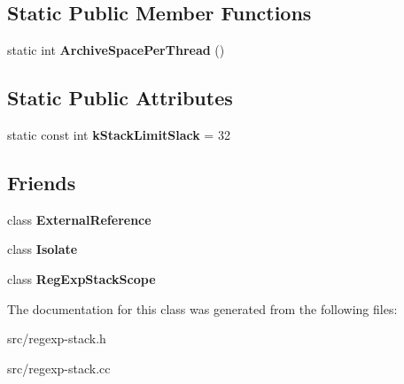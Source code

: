 \subsection*{Static Public Member Functions}
\begin{DoxyCompactItemize}
\item 
\hypertarget{classv8_1_1internal_1_1_reg_exp_stack_aee574d88604a5759319c17356a2202f4}{}static int {\bfseries Archive\+Space\+Per\+Thread} ()\label{classv8_1_1internal_1_1_reg_exp_stack_aee574d88604a5759319c17356a2202f4}

\end{DoxyCompactItemize}
\subsection*{Static Public Attributes}
\begin{DoxyCompactItemize}
\item 
\hypertarget{classv8_1_1internal_1_1_reg_exp_stack_a204fe3ec05de664a5b0d89cb4150f069}{}static const int {\bfseries k\+Stack\+Limit\+Slack} = 32\label{classv8_1_1internal_1_1_reg_exp_stack_a204fe3ec05de664a5b0d89cb4150f069}

\end{DoxyCompactItemize}
\subsection*{Friends}
\begin{DoxyCompactItemize}
\item 
\hypertarget{classv8_1_1internal_1_1_reg_exp_stack_a6cad52a007e84a78f169131b667e2d49}{}class {\bfseries External\+Reference}\label{classv8_1_1internal_1_1_reg_exp_stack_a6cad52a007e84a78f169131b667e2d49}

\item 
\hypertarget{classv8_1_1internal_1_1_reg_exp_stack_aba4f0964bdacf2bbf62cf876e5d28d0a}{}class {\bfseries Isolate}\label{classv8_1_1internal_1_1_reg_exp_stack_aba4f0964bdacf2bbf62cf876e5d28d0a}

\item 
\hypertarget{classv8_1_1internal_1_1_reg_exp_stack_af3a599fb70f578aa7d436828690530b8}{}class {\bfseries Reg\+Exp\+Stack\+Scope}\label{classv8_1_1internal_1_1_reg_exp_stack_af3a599fb70f578aa7d436828690530b8}

\end{DoxyCompactItemize}


The documentation for this class was generated from the following files\+:\begin{DoxyCompactItemize}
\item 
src/regexp-\/stack.\+h\item 
src/regexp-\/stack.\+cc\end{DoxyCompactItemize}
